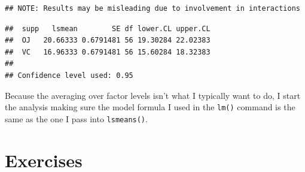 \documentclass[]{book}
\theoremstyle{definition}
\theoremstyle{definition}
\theoremstyle{remark}
\begin{document}
\begin{verbatim}
## NOTE: Results may be misleading due to involvement in interactions
\end{verbatim}

\begin{verbatim}
##  supp   lsmean        SE df lower.CL upper.CL
##  OJ   20.66333 0.6791481 56 19.30284 22.02383
##  VC   16.96333 0.6791481 56 15.60284 18.32383
## 
## Confidence level used: 0.95
\end{verbatim}

Because the averaging over factor levels isn't what I typically want to
do, I start the analysis making sure the model formula I used in the
\texttt{lm()} command is the same as the one I pass into
\texttt{lsmeans()}.

\section{Exercises}\label{exercises-4}
\end{document}
